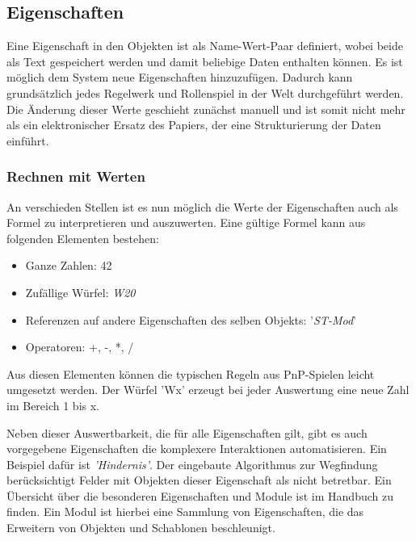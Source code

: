 \subsection{Eigenschaften}
\label{sec:Eigenschaften}
Eine Eigenschaft in den Objekten ist als Name-Wert-Paar definiert, wobei beide als Text gespeichert werden und damit beliebige Daten enthalten können. Es ist möglich dem System neue Eigenschaften hinzuzufügen. Dadurch kann grundsätzlich jedes Regelwerk und Rollenspiel in der Welt durchgeführt werden. Die Änderung dieser Werte geschieht zunächst manuell und ist somit nicht mehr als ein elektronischer Ersatz des Papiers, der eine Strukturierung der Daten einführt.\newline

\subsubsection{Rechnen mit Werten}
An verschieden Stellen ist es nun möglich die Werte der Eigenschaften auch als Formel zu interpretieren und auszuwerten. Eine gültige Formel kann aus folgenden Elementen bestehen:
\begin{itemize}
	\item Ganze Zahlen: 42
	\item Zufällige Würfel: \textit{W20}
	\item Referenzen auf andere Eigenschaften des selben Objekts: '\textit{ST-Mod}'
	\item Operatoren: +, -, *, /
\end{itemize}

Aus diesen Elementen können die typischen Regeln aus PnP-Spielen leicht umgesetzt werden. Der Würfel 'Wx' erzeugt bei jeder Auswertung eine neue Zahl im Bereich 1 bis x.

Neben dieser Auswertbarkeit, die für alle Eigenschaften gilt, gibt es auch vorgegebene Eigenschaften die komplexere Interaktionen automatisieren. Ein Beispiel dafür ist \emph{'Hindernis'}. Der eingebaute Algorithmus zur Wegfindung berücksichtigt Felder mit Objekten dieser Eigenschaft als nicht betretbar. Ein Übersicht über die besonderen Eigenschaften und Module ist im Handbuch zu finden. Ein Modul ist hierbei eine Sammlung von Eigenschaften, die das Erweitern von Objekten und Schablonen beschleunigt.

